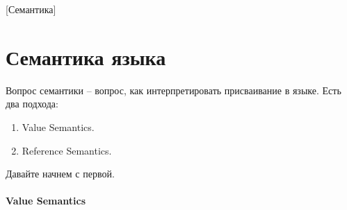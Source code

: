 [Семантика]


\section{Семантика языка}
\label{section::Semantics}

Вопрос семантики -- вопрос, как интерпретировать присваивание в языке.
Есть два подхода:
\begin{enumerate}
\item Value Semantics.
\item Reference Semantics.
\end{enumerate}
Давайте начнем с первой.

\paragraph{Value Semantics}

